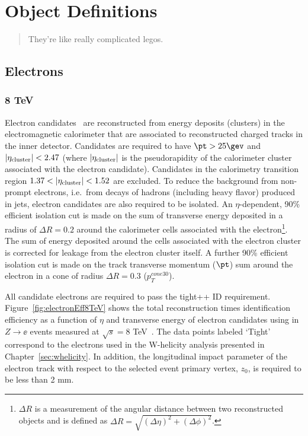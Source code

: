 \chapter{Object Definitions}
\label{sec:ObjectDefinitions}
\begin{quote}
  They're like really complicated legos.
\end{quote}

\section{Electrons}
\subsection{8 TeV}
Electron candidates~\cite{ElectronPerformance} are reconstructed from energy deposits (clusters) in the electromagnetic calorimeter that are associated to reconstructed charged tracks in the inner detector.  Candidates are required to have $\pt > 25 \gev$ and $|\eta_{\rm cluster}| < 2.47$ (where $|\eta_{\rm cluster}|$ is the pseudorapidity of the calorimeter cluster associated with the electron candidate).  Candidates in the calorimetry transition region $1.37 < |\eta_{\rm cluster}| < 1.52$ are excluded.  To reduce the background from non-prompt electrons, i.e.~from decays of hadrons (including heavy flavor) produced in jets, electron candidates are also required to be isolated. An $\eta$-dependent, 90\% efficient isolation cut is made on the sum of transverse energy deposited in a radius of $\Delta R = 0.2$ around the calorimeter cells associated with the electron\footnote{$\Delta R$ is a measurement of the angular distance between two reconstructed objects and is defined as $\Delta R = \sqrt{(\Delta\eta)^2 + (\Delta\phi)^2}$.}. The sum of energy deposited around the cells associated with the electron cluster is corrected for leakage from the electron cluster itself.  A further 90\% efficient isolation cut is made on the track transverse momentum ($\pt$) sum around the electron in a cone of radius $\Delta R = 0.3$ ($p_{T}^{cone30}$). 

All candidate electrons are required to pass the tight++ ID requirement. Figure~\ref{fig:electronEff8TeV} shows the total reconstruction times identification efficiency as a function of $\eta$ and transverse energy of electron candidates using in $Z\rightarrow \ee$ events measured at $\sqrt{s}=8$ TeV~\cite{Aaboud:2016vfy}. The data points labeled `Tight' correspond to the electrons used in the W-helicity analysis presented in Chapter~\ref{sec:whelicity}. In addition, the longitudinal impact parameter of the electron track with respect to the selected event primary vertex, $z_{0}$, is required to be less than 2 mm. 

